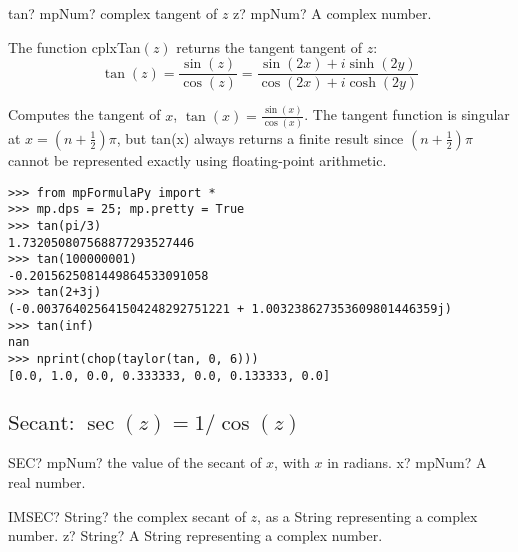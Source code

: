\begin{mpFunctionsExtract}
	\mpFunctionOne
	{tan? mpNum? complex tangent of $z$}
	{z? mpNum? A complex number.}
\end{mpFunctionsExtract}

\vspace{0.3cm}
The function \textsf{cplxTan$(z)$} returns the tangent tangent of $z$: 
\begin{equation}
	\tan(z) =\frac{\sin(z)}{\cos(z)} = \frac{\sin(2x)+i \sinh(2y)}{\cos(2x)+i \cosh(2y)}
\end{equation}


Computes the tangent of $x$, $\tan(x)=\frac{\sin(x)}{\cos(x)}$. The tangent function is singular at $x=(n+\tfrac{1}{2})\pi$, but tan(x) always returns a finite result since $(n+\tfrac{1}{2})\pi$ cannot be represented exactly using floating-point arithmetic.

\begin{lstlisting}
>>> from mpFormulaPy import *
>>> mp.dps = 25; mp.pretty = True
>>> tan(pi/3)
1.732050807568877293527446
>>> tan(100000001)
-0.2015625081449864533091058
>>> tan(2+3j)
(-0.003764025641504248292751221 + 1.003238627353609801446359j)
>>> tan(inf)
nan
>>> nprint(chop(taylor(tan, 0, 6)))
[0.0, 1.0, 0.0, 0.333333, 0.0, 0.133333, 0.0]
\end{lstlisting}




\newpage
\subsection{\texorpdfstring{$\text{Secant: }\sec(z) = 1/\cos(z)$}{sec}}

\begin{mpFunctionsExtract}
	\mpWorksheetFunctionOneNotImplemented
	{SEC? mpNum? the value of the secant of $x$, with $x$ in radians.}
	{x? mpNum? A real number.}
\end{mpFunctionsExtract}

\vspace{0.6cm}
\begin{mpFunctionsExtract}
	\mpWorksheetFunctionOneNotImplemented
	{IMSEC? String? the complex secant of $z$, as a String representing a complex number.}
	{z? String? A String representing a complex number.}
\end{mpFunctionsExtract}



